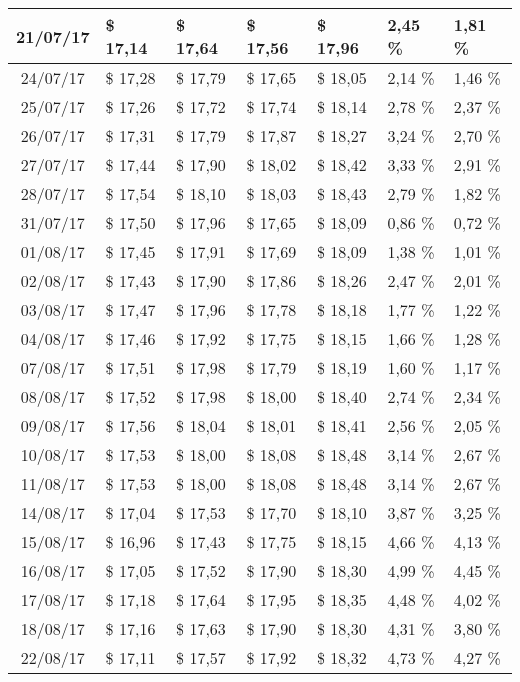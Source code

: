\begin{center}
\begin{longtable}{|c|p{1.5cm}|p{1.5cm}|p{1.5cm}|p{1.5cm}|p{1.5cm}|p{1.5cm}|}
21/07/17 & \$ 17,14 & \$ 17,64 & \$ 17,56 & \$ 17,96 & 2,45 \% & 1,81 \% \\ \hline
24/07/17 & \$ 17,28 & \$ 17,79 & \$ 17,65 & \$ 18,05 & 2,14 \% & 1,46 \% \\ \hline
25/07/17 & \$ 17,26 & \$ 17,72 & \$ 17,74 & \$ 18,14 & 2,78 \% & 2,37 \% \\ \hline
26/07/17 & \$ 17,31 & \$ 17,79 & \$ 17,87 & \$ 18,27 & 3,24 \% & 2,70 \% \\ \hline
27/07/17 & \$ 17,44 & \$ 17,90 & \$ 18,02 & \$ 18,42 & 3,33 \% & 2,91 \% \\ \hline
28/07/17 & \$ 17,54 & \$ 18,10 & \$ 18,03 & \$ 18,43 & 2,79 \% & 1,82 \% \\ \hline
31/07/17 & \$ 17,50 & \$ 17,96 & \$ 17,65 & \$ 18,09 & 0,86 \% & 0,72 \% \\ \hline
01/08/17 & \$ 17,45 & \$ 17,91 & \$ 17,69 & \$ 18,09 & 1,38 \% & 1,01 \% \\ \hline
02/08/17 & \$ 17,43 & \$ 17,90 & \$ 17,86 & \$ 18,26 & 2,47 \% & 2,01 \% \\ \hline
03/08/17 & \$ 17,47 & \$ 17,96 & \$ 17,78 & \$ 18,18 & 1,77 \% & 1,22 \% \\ \hline
04/08/17 & \$ 17,46 & \$ 17,92 & \$ 17,75 & \$ 18,15 & 1,66 \% & 1,28 \% \\ \hline
07/08/17 & \$ 17,51 & \$ 17,98 & \$ 17,79 & \$ 18,19 & 1,60 \% & 1,17 \% \\ \hline
08/08/17 & \$ 17,52 & \$ 17,98 & \$ 18,00 & \$ 18,40 & 2,74 \% & 2,34 \% \\ \hline
09/08/17 & \$ 17,56 & \$ 18,04 & \$ 18,01 & \$ 18,41 & 2,56 \% & 2,05 \% \\ \hline
10/08/17 & \$ 17,53 & \$ 18,00 & \$ 18,08 & \$ 18,48 & 3,14 \% & 2,67 \% \\ \hline
11/08/17 & \$ 17,53 & \$ 18,00 & \$ 18,08 & \$ 18,48 & 3,14 \% & 2,67 \% \\ \hline
14/08/17 & \$ 17,04 & \$ 17,53 & \$ 17,70 & \$ 18,10 & 3,87 \% & 3,25 \% \\ \hline
15/08/17 & \$ 16,96 & \$ 17,43 & \$ 17,75 & \$ 18,15 & 4,66 \% & 4,13 \% \\ \hline
16/08/17 & \$ 17,05 & \$ 17,52 & \$ 17,90 & \$ 18,30 & 4,99 \% & 4,45 \% \\ \hline
17/08/17 & \$ 17,18 & \$ 17,64 & \$ 17,95 & \$ 18,35 & 4,48 \% & 4,02 \% \\ \hline
18/08/17 & \$ 17,16 & \$ 17,63 & \$ 17,90 & \$ 18,30 & 4,31 \% & 3,80 \% \\ \hline
22/08/17 & \$ 17,11 & \$ 17,57 & \$ 17,92 & \$ 18,32 & 4,73 \% & 4,27 \% \\ \hline

\end{longtable}
\end{center}
